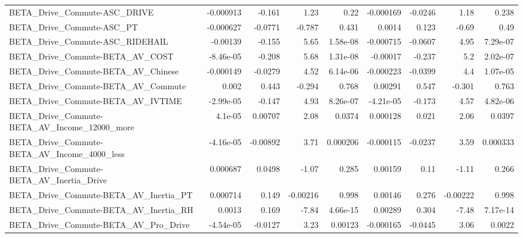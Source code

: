 \begin{tabular}{lrrrrrrrr}
BETA\_Drive\_Commute-ASC\_DRIVE                       &   -0.000913 &       -0.161 &     1.23 &     0.22 &  -0.000169 &     -0.0246 &         1.18 &         0.238 \\
BETA\_Drive\_Commute-ASC\_PT                          &   -0.000627 &      -0.0771 &   -0.787 &    0.431 &     0.0014 &       0.123 &        -0.69 &          0.49 \\
BETA\_Drive\_Commute-ASC\_RIDEHAIL                    &    -0.00139 &       -0.155 &     5.65 & 1.58e-08 &  -0.000715 &     -0.0607 &         4.95 &      7.29e-07 \\
BETA\_Drive\_Commute-BETA\_AV\_COST                    &   -8.46e-05 &       -0.208 &     5.68 & 1.31e-08 &   -0.00017 &      -0.237 &          5.2 &      2.02e-07 \\
BETA\_Drive\_Commute-BETA\_AV\_Chinese                 &   -0.000149 &      -0.0279 &     4.52 & 6.14e-06 &  -0.000223 &     -0.0399 &          4.4 &      1.07e-05 \\
BETA\_Drive\_Commute-BETA\_AV\_Commute                 &       0.002 &        0.443 &   -0.294 &    0.768 &    0.00291 &       0.547 &       -0.301 &         0.763 \\
BETA\_Drive\_Commute-BETA\_AV\_IVTIME                  &   -2.99e-05 &       -0.147 &     4.93 & 8.26e-07 &  -4.21e-05 &      -0.173 &         4.57 &      4.82e-06 \\
BETA\_Drive\_Commute-BETA\_AV\_Income\_12000\_more       &     4.1e-05 &      0.00707 &     2.08 &   0.0374 &   0.000128 &       0.021 &         2.06 &        0.0397 \\
BETA\_Drive\_Commute-BETA\_AV\_Income\_4000\_less        &   -4.16e-05 &     -0.00892 &     3.71 & 0.000206 &  -0.000115 &     -0.0237 &         3.59 &      0.000333 \\
BETA\_Drive\_Commute-BETA\_AV\_Inertia\_Drive           &    0.000687 &       0.0498 &    -1.07 &    0.285 &    0.00159 &        0.11 &        -1.11 &         0.266 \\
BETA\_Drive\_Commute-BETA\_AV\_Inertia\_PT              &    0.000714 &        0.149 & -0.00216 &    0.998 &    0.00146 &       0.276 &     -0.00222 &         0.998 \\
BETA\_Drive\_Commute-BETA\_AV\_Inertia\_RH              &      0.0013 &        0.169 &    -7.84 & 4.66e-15 &    0.00289 &       0.304 &        -7.48 &      7.17e-14 \\
BETA\_Drive\_Commute-BETA\_AV\_Pro\_Drive               &   -4.54e-05 &      -0.0127 &     3.23 &  0.00123 &  -0.000165 &     -0.0445 &         3.06 &        0.0022 \\

\end{tabular}
